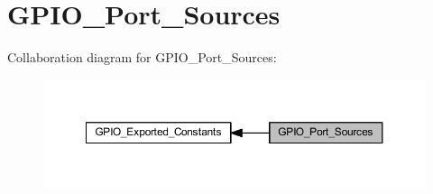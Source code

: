 \hypertarget{group___g_p_i_o___port___sources}{}\section{G\+P\+I\+O\+\_\+\+Port\+\_\+\+Sources}
\label{group___g_p_i_o___port___sources}
Collaboration diagram for G\+P\+I\+O\+\_\+\+Port\+\_\+\+Sources\+:
\nopagebreak
\begin{figure}[H]
\begin{center}
\leavevmode
\includegraphics[width=350pt]{group___g_p_i_o___port___sources}
\end{center}
\end{figure}
